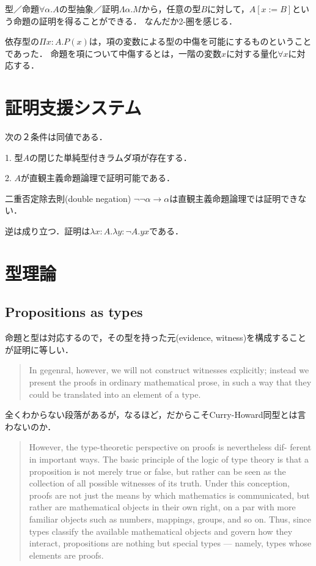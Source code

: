 \documentclass[uplatex, dvipdfmx]{jsreport}
\begin{document}
型／命題$\forall\alpha.A$の型抽象／証明$\Lambda\alpha.M$から，任意の型$B$に対して，$A[x:=B]$という命題の証明を得ることができる．
なんだか2-圏を感じる．

依存型の$\Pi x:A.P(x)$は，項の変数による型の中傷を可能にするものということであった．
命題を項について中傷するとは，一階の変数$x$に対する量化$\forall x$に対応する．

\section{証明支援システム}

\begin{theorem}次の２条件は同値である．

    1. 型$A$の閉じた単純型付きラムダ項が存在する．

    2. $A$が直観主義命題論理で証明可能である．
\end{theorem}
\begin{corollary}
    二重否定除去則(double negation) $\lnot\lnot\alpha\to\alpha$は直観主義命題論理では証明できない．
\end{corollary}
\begin{remark}
    逆は成り立つ．証明は$\lambda x:A.\lambda y:\lnot A.yx$である．
\end{remark}

\section{型理論}

\subsection{Propositions as types}
命題と型は対応するので，その型を持った元(evidence, witness)を構成することが証明に等しい．
\begin{quote}
    In gegenral, however, we will not construct witnesses explicitly; instead we present the proofs in ordinary mathematical prose, in such a way that they could be translated into an element of a type.
\end{quote}
全くわからない段落があるが，なるほど，だからこそCurry-Howard同型とは言わないのか．
\begin{quote}
    However, the type-theoretic perspective on proofs is nevertheless dif- ferent in important ways. The basic principle of the logic of type theory is that a proposition is not merely true or false, but rather can be seen as the collection of all possible witnesses of its truth. Under this conception, proofs are not just the means by which mathematics is communicated, but rather are mathematical objects in their own right, on a par with more familiar objects such as numbers, mappings, groups, and so on. Thus, since types classify the available mathematical objects and govern how they interact, propositions are nothing but special types — namely, types whose elements are proofs.
\end{quote}
\end{document}
